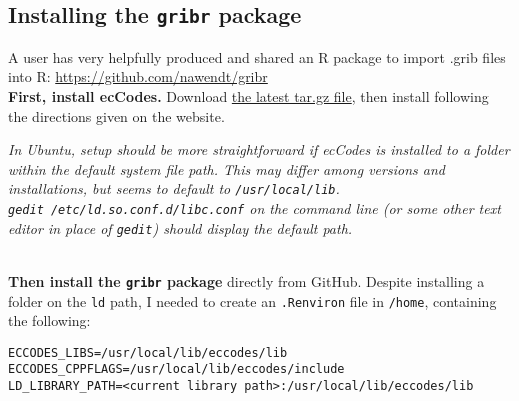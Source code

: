 \documentclass[10pt,fleqn]{article}
\begin{document}
\subsection{Installing the \texttt{gribr} package}

A user has very helpfully produced and shared an R package to import .grib files into R: \url{https://github.com/nawendt/gribr}\\[10pt]

\textbf{First, install ecCodes.} Download \href{https://software.ecmwf.int/wiki/display/ECC/Releases}{the latest tar.gz file}, then install following the directions given on the website. 

\textit{In Ubuntu, setup should be more straightforward if ecCodes is installed to a folder within the default system file path. This may differ among versions and installations, but seems to default to \texttt{/usr/local/lib}.\\
\texttt{gedit /etc/ld.so.conf.d/libc.conf} on the command line (or some other text editor in place of \texttt{gedit}) should display the default path. }

\\[10pt]

\textbf{Then install the \texttt{gribr} package} directly from GitHub. Despite installing a folder on the \texttt{ld} path, I needed to create an \texttt{.Renviron} file in \texttt{/home}, containing the following:
\begin{verbatim}
ECCODES_LIBS=/usr/local/lib/eccodes/lib
ECCODES_CPPFLAGS=/usr/local/lib/eccodes/include
LD_LIBRARY_PATH=<current library path>:/usr/local/lib/eccodes/lib
\end{verbatim}
\end{document}
